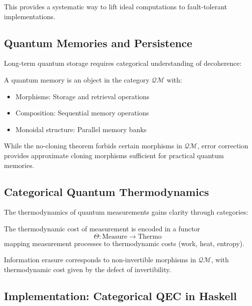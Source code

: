 This provides a systematic way to lift ideal computations to fault-tolerant implementations.

\subsection{Quantum Memories and Persistence}

Long-term quantum storage requires categorical understanding of decoherence:

\begin{definition}
A quantum memory is an object in the category $\mathcal{QM}$ with:
\begin{itemize}
\item Morphisms: Storage and retrieval operations
\item Composition: Sequential memory operations
\item Monoidal structure: Parallel memory banks
\end{itemize}
\end{definition}

\begin{proposition}[No-Go to Go]
While the no-cloning theorem forbids certain morphisms in $\mathcal{QM}$, error correction provides approximate cloning morphisms sufficient for practical quantum memories.
\end{proposition}

\subsection{Categorical Quantum Thermodynamics}

The thermodynamics of quantum measurements gains clarity through categories:

\begin{definition}
The thermodynamic cost of measurement is encoded in a functor
\[
\Theta: \text{Measure} \to \text{Thermo}
\]
mapping measurement processes to thermodynamic costs (work, heat, entropy).
\end{definition}

\begin{theorem}
Information erasure corresponds to non-invertible morphisms in $\mathcal{QM}$, with thermodynamic cost given by the defect of invertibility.
\end{theorem}

\subsection{Implementation: Categorical QEC in Haskell}

